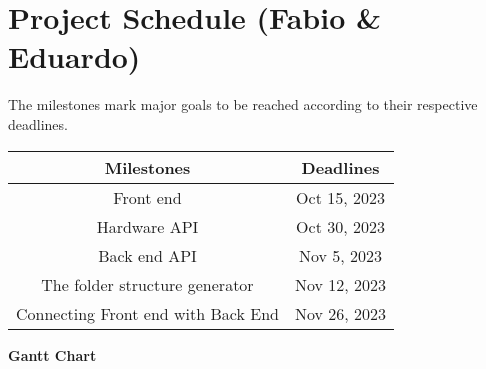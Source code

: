  \section{Project Schedule (Fabio \& Eduardo)}
 The milestones mark major goals to be reached according to their respective deadlines.
\begin{table}[H]
    \centering
    \begin{tabular}{||c | c||} 
        \hline
        \rowcolor{cyan!50}
        Milestones & Deadlines\\
        \hline
        Front end & Oct 15, 2023\\
        \hline
        Hardware API & Oct 30, 2023\\
        \hline
        Back end API & Nov 5, 2023\\
        \hline
        The folder structure generator & Nov 12, 2023\\
        \hline
        Connecting Front end with Back End & Nov 26, 2023\\
        \hline
    \end{tabular}
\end{table}
\textbf{Gantt Chart}\\

